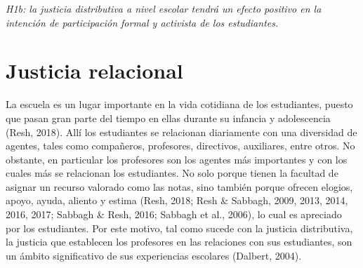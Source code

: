 \documentclass[12pt,twoside]{templates/facsothesis}
\begin{document}
\emph{H1b: la justicia distributiva a nivel escolar tendrá un efecto positivo en la intención de participación formal y activista de los estudiantes.}

\hypertarget{justicia-relacional}{%
\section{Justicia relacional}\label{justicia-relacional}}

La escuela es un lugar importante en la vida cotidiana de los estudiantes, puesto que pasan gran parte del tiempo en ellas durante su infancia y adolescencia (Resh, 2018). Allí los estudiantes se relacionan diariamente con una diversidad de agentes, tales como compañeros, profesores, directivos, auxiliares, entre otros. No obstante, en particular los profesores son los agentes más importantes y con los cuales más se relacionan los estudiantes. No solo porque tienen la facultad de asignar un recurso valorado como las notas, sino también porque ofrecen elogios, apoyo, ayuda, aliento y estima (Resh, 2018; Resh \& Sabbagh, 2009, 2013, 2014, 2016, 2017; Sabbagh \& Resh, 2016; Sabbagh et al., 2006), lo cual es apreciado por los estudiantes. Por este motivo, tal como sucede con la justicia distributiva, la justicia que establecen los profesores en las relaciones con sus estudiantes, son un ámbito significativo de sus experiencias escolares (Dalbert, 2004).
\end{document}
